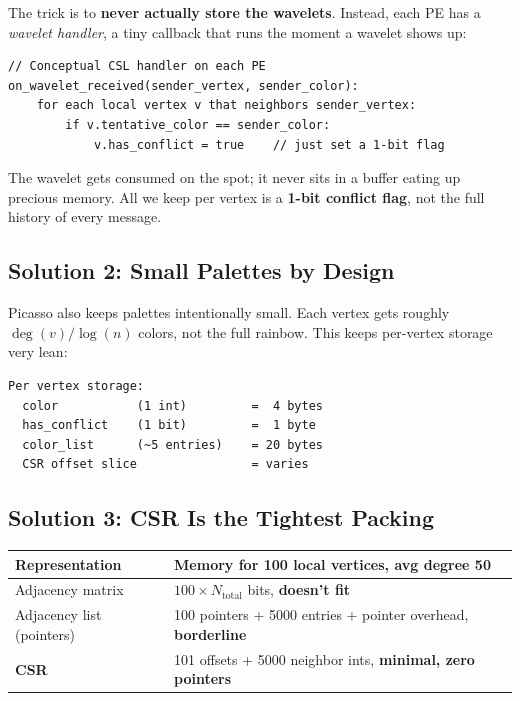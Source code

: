 \documentclass[11pt,letterpaper]{article}
\begin{document}
The trick is to \textbf{never actually store the wavelets}. Instead, each PE has a \emph{wavelet handler}, a tiny callback that runs the moment a wavelet shows up:

\begin{lstlisting}
// Conceptual CSL handler on each PE
on_wavelet_received(sender_vertex, sender_color):
    for each local vertex v that neighbors sender_vertex:
        if v.tentative_color == sender_color:
            v.has_conflict = true    // just set a 1-bit flag
\end{lstlisting}

The wavelet gets consumed on the spot; it never sits in a buffer eating up precious memory. All we keep per vertex is a \textbf{1-bit conflict flag}, not the full history of every message.

\subsection{Solution 2: Small Palettes by Design}

Picasso also keeps palettes intentionally small. Each vertex gets roughly $\deg(v) / \log(n)$ colors, not the full rainbow. This keeps per-vertex storage very lean:

\begin{lstlisting}
Per vertex storage:
  color           (1 int)         =  4 bytes
  has_conflict    (1 bit)         =  1 byte
  color_list      (~5 entries)    = 20 bytes
  CSR offset slice                = varies
\end{lstlisting}

\subsection{Solution 3: CSR Is the Tightest Packing}

\begin{center}
\renewcommand{\arraystretch}{1.2}
\begin{tabular}{>{\raggedright}p{4cm} p{8.5cm}}
\toprule
\textbf{Representation} & \textbf{Memory for 100 local vertices, avg degree 50} \\
\midrule
Adjacency matrix & $100 \times N_{\text{total}}$ bits, \textbf{doesn't fit} \\
Adjacency list (pointers) & 100 pointers + 5000 entries + pointer overhead, \textbf{borderline} \\
\textbf{CSR} & 101 offsets + 5000 neighbor ints, \textbf{minimal, zero pointers} \\
\bottomrule
\end{tabular}
\end{center}
\end{document}
